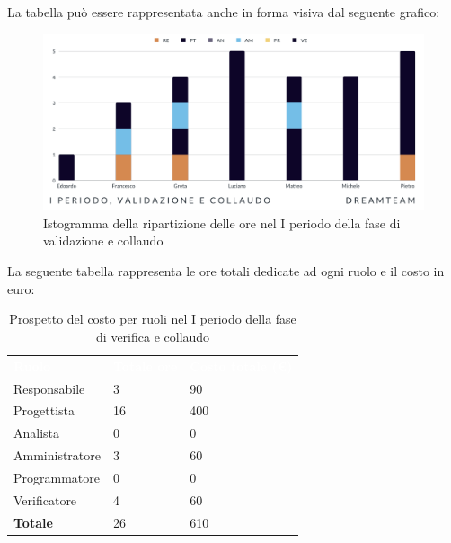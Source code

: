 La tabella può essere rappresentata anche in forma visiva dal seguente grafico:
\begin{figure}[!h]
\centering
\includegraphics[scale=0.65]{Sezioni/SezioniPreventivo/grafici/Validazione_collaudo_I_periodo.png}
\caption{Istogramma della ripartizione delle ore nel I periodo della fase di validazione e collaudo}
\end{figure}

La seguente tabella rappresenta le ore totali dedicate ad ogni ruolo e il costo in euro:

\begin{table}[!htbp]
\begin{center}
\renewcommand{\arraystretch}{1.5}
\begin{tabular}{ m{}<{\centering}  m{}<{\centering} m{}<{\centering}}
	\rowcolor{darkblue}
	\textcolor{white}{\textbf{Ruolo}}&\textcolor{white}{\textbf{Totale ore}}&\textcolor{white}{\textbf{Costo totale (\euro)}}\\ 

	Responsabile  & 3 & 90 \\	
	
	Progettista & 16 & 400 \\
	
	Analista & 0 & 0 \\

	Amministratore & 3 & 60 \\
	
	Programmatore & 0 & 0 \\
	
	Verificatore & 4 & 60 \\
	
	\textbf{Totale} & 26 & 610 \\
	
\end{tabular}
\caption{Prospetto del costo per ruoli nel I periodo della fase di verifica e collaudo}
\end{center}
\end{table}

